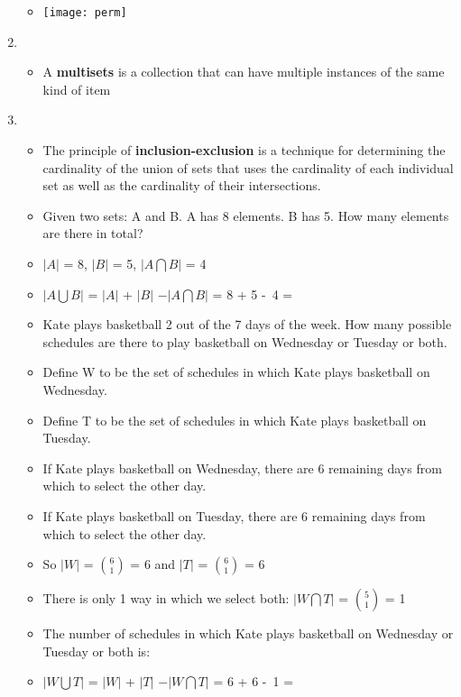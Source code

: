 \documentclass[12pt,a4paper]{article}
\begin{document}
\begin{enumerate}
\begin{itemize}
    \item[] \texttt{[image: perm]} 
  \end{itemize}
  \item {}
  \begin{itemize}
    \item A \textbf{multisets} is a collection that can have multiple instances of the same kind of item
  \end{itemize}
  \item {}
  \begin{itemize}
    \item The principle of \textbf{inclusion-exclusion} is a technique for determining the cardinality of the union of sets that uses the cardinality of each individual set as well as the cardinality of their intersections.
    \item Given two sets: A and B. A has 8 elements. B has 5. How many elements are there in total?
    \item[] \(\vert A \vert \) = 8,  \(\vert B \vert \) = 5, \(\vert A \bigcap B \vert \) = 4
    \item[] \(\vert A \bigcup B \vert \) = \(\vert A \vert \) + \(\vert B \vert \)  \( - \vert A \bigcap B \vert \) = 8 + 5 -\ 4 = 
    \item Kate plays basketball 2 out of the 7 days of the week. How many possible schedules are there to play basketball on Wednesday or Tuesday or both.
    \item[] Define W to be the set of schedules in which Kate plays basketball on Wednesday.
    \item[] Define T to be the set of schedules in which Kate plays basketball on Tuesday.
    \item[] If Kate plays basketball on Wednesday, there are 6 remaining days from which to select the other day.
    \item[] If Kate plays basketball on Tuesday, there are 6 remaining days from which to select the other day.
    \item[] So \(\vert W \vert \) = \(\binom{6}{1}\) = 6 and \(\vert T \vert \) = \(\binom{6}{1}\) = 6
    \item[] There is only 1 way in which we select both: \(\vert W \bigcap T \vert \) =  \(\binom{5}{1}\) = 1 
    \item[] The number of schedules in which Kate plays basketball on Wednesday or Tuesday or both is:
    \item[] \(\vert W \bigcup T \vert \) = \(\vert W \vert \) + \(\vert T \vert \)  \( - \vert W  \bigcap T \vert \) = 6 + 6 -\ 1 = 
  \end{itemize}
\end{enumerate}
\end{document}
